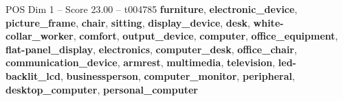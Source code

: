 \begin{textsample}{POS Dim 1 – Score 23.00 – t004785}  \label{ex:f1_pos_034}
\textbf{furniture}, \textbf{electronic\_device}, \textbf{picture\_frame}, \textbf{chair}, \textbf{sitting}, \textbf{display\_device}, \textbf{desk}, \textbf{white-collar\_worker}, \textbf{comfort}, \textbf{output\_device}, \textbf{computer}, \textbf{office\_equipment}, \textbf{flat-panel\_display}, \textbf{electronics}, \textbf{computer\_desk}, \textbf{office\_chair}, \textbf{communication\_device}, \textbf{armrest}, \textbf{multimedia}, \textbf{television}, \textbf{led-backlit\_lcd}, \textbf{businessperson}, \textbf{computer\_monitor}, \textbf{peripheral}, \textbf{desktop\_computer}, \textbf{personal\_computer}

\end{textsample}
